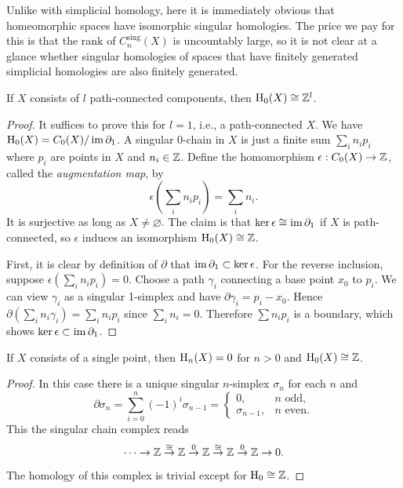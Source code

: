 Unlike with simplicial homology, here it is immediately obvious that homeomorphic spaces have isomorphic singular homologies. The price we pay for this is that the rank of $C^{\text{sing}}_n(X)$ is uncountably large, so it is not clear at a glance whether singular homologies of spaces that have finitely generated simplicial homologies are also finitely generated. 

\begin{prop}
    If $X$ consists of $l$ path-connected components, then $\mathrm{H}_0(X)\cong \mathbb{Z}^l$.
\end{prop}
\begin{proof}
     It suffices to prove this for $l=1$, i.e., a path-connected $X$. We have $\mathrm{H}_0(X)=C_0(X)/\operatorname{im}\partial_1$. A singular 0-chain in $X$ is just a finite sum $\sum_i n_i p_i$ where $p_i$ are points in $X$ and $n_i\in\mathbb{Z}$. Define the homomorphism $\epsilon:C_0(X)\to \mathbb{Z}$, called the \emph{augmentation map}, by
     \[\epsilon\left(\sum_i n_i p_i\right)=\sum_i n_i.\]
     It is surjective as long as $X\neq\varnothing$. The claim is that $\ker\epsilon\cong\operatorname{im}\partial_1$ if $X$ is path-connected, so $\epsilon $ induces an isomorphism $\mathrm{H}_0(X)\cong \mathbb{Z}$.
     
     First, it is clear by definition of $\partial$ that $\operatorname{im}\partial_1\subset\ker\epsilon$. For the reverse inclusion, suppose $\epsilon(\sum_i n_i p_i)=0$. Choose a path $\gamma_i$ connecting a base point $x_0$ to $p_i$. We can view $\gamma_i$ as a singular 1-simplex and have $\partial\gamma_i=p_i-x_0$. Hence $\partial(\sum_i n_i\gamma_i)=\sum_i n_i p_i$ since $\sum_i n_i=0$. Therefore $\sum n_i p_i$ is a boundary, which shows $\ker\epsilon\subset\operatorname{im}\partial_1$.
\end{proof}

\begin{prop}
    If $X$ consists of a single point, then $\mathrm{H}_n(X)=0$ for $n>0$ and $\mathrm{H}_0(X)\cong \mathbb{Z}$.
\end{prop}
\begin{proof}
     In this case there is a unique singular $n$-simplex $\sigma_n$ for each $n$ and 
     \[\partial\sigma_n=\sum_{i=0}^n(-1)^i\sigma_{n-1}=\begin{cases}
     0,& n\text{ odd},\\
     \sigma_{n-1},& n\text{ even}.
     \end{cases}\]
     This the singular chain complex reads
     \[\cdots\to \mathbb{Z}\overset\cong\to \mathbb{Z}\overset 0\to \mathbb{Z}\overset\cong\to\mathbb{Z}\overset 0\to\mathbb{Z}\to 0.\]
     The homology of this complex is trivial except for $\mathrm{H}_0\cong \mathbb{Z} $.
\end{proof}

